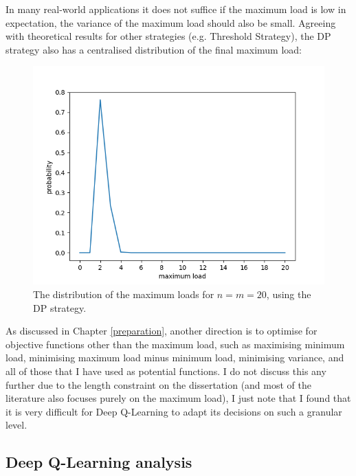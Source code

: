 In many real-world applications it does not suffice if the maximum load is low in expectation, the variance of the maximum load should also be small. Agreeing with theoretical results for other strategies (e.g. Threshold Strategy), the DP strategy also has a centralised distribution of the final maximum load:


\begin{figure}[h!] \label{two-thinning-maxload-distribution}
    \centering
    \includegraphics[scale=1.0]{Chapter4/Figs/max_load_distribution_20_20.png}
    \caption{The distribution of the maximum loads for $n=m=20$, using the DP strategy.}
\end{figure}


As discussed in Chapter \ref{preparation}, another direction is to optimise for objective functions other than the maximum load, such as maximising minimum load, minimising maximum load minus minimum load, minimising variance, and all of those that I have used as potential functions. I do not discuss this any further due to the length constraint on the dissertation (and most of the literature also focuses purely on the maximum load), I just note that I found that it is very difficult for Deep Q-Learning to adapt its decisions on such a granular level. 


\subsection{Deep Q-Learning analysis}






